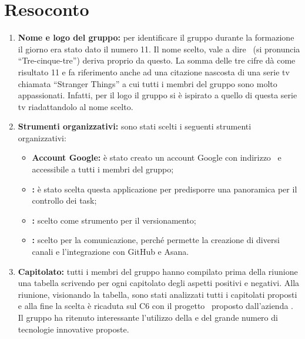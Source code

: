 \documentclass[VER-2017-12-08.tex]{subfiles}
\begin{document}
\chapter{Resoconto}
\begin{enumerate}
	\item \textbf{Nome e logo del gruppo:} per identificare il gruppo durante la formazione il giorno  era stato dato il numero 11. Il nome scelto, vale a dire \gruppo\ (si pronuncia ``Tre-cinque-tre'') deriva proprio da questo. La somma delle tre cifre dà come risultato 11 e fa riferimento anche ad una citazione nascosta di una serie tv chiamata ``Stranger Things'' a cui tutti i membri del gruppo sono molto appassionati. Infatti, per il logo il gruppo si è ispirato a quello di questa serie tv riadattandolo al nome scelto.
	\item \textbf{Strumenti organizzativi:} sono stati scelti i seguenti strumenti organizzativi:
	\begin{itemize}
		\item \textbf{Account Google:} è stato creato un account Google con indirizzo \mailgroup\ e accessibile a tutti i membri del gruppo;
		\item \textbf{:} è stato scelta questa applicazione per predisporre una panoramica per il controllo dei task;
		\item \textbf{:} scelto come strumento per il versionamento;
		\item \textbf{:} scelto per la comunicazione, perché permette la creazione di diversi canali e l'integrazione con GitHub e Asana.
	\end{itemize}
	\item \textbf{Capitolato:} tutti i membri del gruppo hanno compilato prima della riunione una tabella scrivendo per ogni capitolato degli aspetti positivi e negativi. Alla riunione, visionando la tabella, sono stati analizzati tutti i capitolati proposti e alla fine la scelta è ricaduta sul C6 con il progetto \progetto\ proposto dall'azienda \Proponente. Il gruppo ha ritenuto interessante l'utilizzo della   e del grande numero di tecnologie innovative proposte. 
\end{enumerate} 
\end{document}

